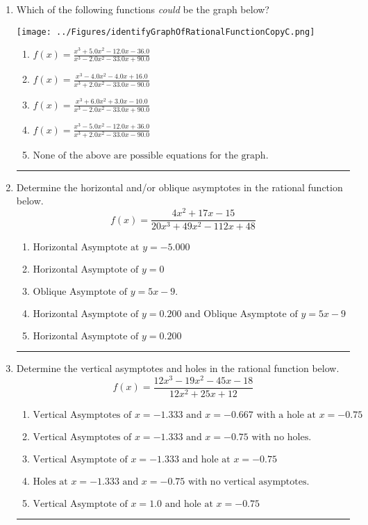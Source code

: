 \documentclass[14pt]{extbook}
\newcommand{\litem}[1]{\item#1\hspace*{-1cm}\rule{\textwidth}{0.4pt}}
\begin{document}
\begin{enumerate}
{\begin{enumerate}[label=\Alph*.]
\end{enumerate} }
\litem{
Which of the following functions \textit{could} be the graph below?
\begin{center}
    \texttt{[image: ../Figures/identifyGraphOfRationalFunctionCopyC.png]}
\end{center}
\begin{enumerate}[label=\Alph*.]
\item \( f(x)=\frac{x^{3} +5.0 x^{2} -12.0 x -36.0}{x^{3} -2.0 x^{2} -33.0 x + 90.0} \)
\item \( f(x)=\frac{x^{3} -4.0 x^{2} -4.0 x + 16.0}{x^{3} +2.0 x^{2} -33.0 x -90.0} \)
\item \( f(x)=\frac{x^{3} +6.0 x^{2} +3.0 x -10.0}{x^{3} -2.0 x^{2} -33.0 x + 90.0} \)
\item \( f(x)=\frac{x^{3} -5.0 x^{2} -12.0 x + 36.0}{x^{3} +2.0 x^{2} -33.0 x -90.0} \)
\item \( \text{None of the above are possible equations for the graph.} \)

\end{enumerate} }
\litem{
Determine the horizontal and/or oblique asymptotes in the rational function below.\[ f(x) = \frac{4x^{2} +17 x -15}{20x^{3} +49 x^{2} -112 x + 48} \]\begin{enumerate}[label=\Alph*.]
\item \( \text{Horizontal Asymptote at } y = -5.000 \)
\item \( \text{Horizontal Asymptote of } y = 0 \)
\item \( \text{Oblique Asymptote of } y = 5x -9. \)
\item \( \text{Horizontal Asymptote of } y = 0.200 \text{ and Oblique Asymptote of } y = 5x -9 \)
\item \( \text{Horizontal Asymptote of } y = 0.200  \)

\end{enumerate} }
\litem{
Determine the vertical asymptotes and holes in the rational function below.\[ f(x) = \frac{12x^{3} -19 x^{2} -45 x -18}{12x^{2} +25 x + 12} \]\begin{enumerate}[label=\Alph*.]
\item \( \text{Vertical Asymptotes of } x = -1.333 \text{ and } x = -0.667 \text{ with a hole at } x = -0.75 \)
\item \( \text{Vertical Asymptotes of } x = -1.333 \text{ and } x = -0.75 \text{ with no holes.} \)
\item \( \text{Vertical Asymptote of } x = -1.333 \text{ and hole at } x = -0.75 \)
\item \( \text{Holes at } x = -1.333 \text{ and } x = -0.75 \text{ with no vertical asymptotes.} \)
\item \( \text{Vertical Asymptote of } x = 1.0 \text{ and hole at } x = -0.75 \)


\end{enumerate}}
\end{enumerate}
\end{document}
